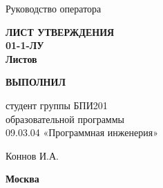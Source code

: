 \vfill

    \textbf{\uppercase{\docTitle}}

    \bigskip

    Руководство оператора

    \bigskip

    \textbf{
    	\Large
    		ЛИСТ УТВЕРЖДЕНИЯ \\
    	\large
    		{\docId} 01-1-ЛУ \\
    	\normalsize
    		Листов \pageref*{LastPage}
    }

\vfill

    \makebox[0.45\textwidth]{}\hfil%
    \begin{minipage}[t]{0.45\textwidth}\centering
    	\textbf{ВЫПОЛНИЛ}
            
    	студент группы БПИ201 \\
    	образовательной программы \\
    	09.03.04 «Программная инженерия» \\
    \end{minipage}

\bigskip

    \makebox[0.45\textwidth]{}\hfil%
    \begin{minipage}[t]{0.45\textwidth}\centering
    	\placename Коннов И.А. \\
    	\placedate
    \end{minipage}

\vskip 1.5cm

    \textbf{Москва \YEAR}